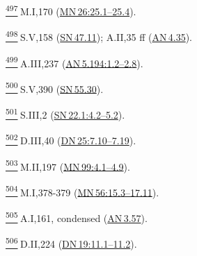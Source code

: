 \label{footprints_split_025.html_fn497}
\hyperref[footprints_split_013.htmlux5cux23fnref497]{\textsuperscript{497}} M.I,170
(\href{https://suttacentral.net/mn26/en/sujato\#25.1}{MN\,26:25.1--25.4}).

\label{footprints_split_025.html_fn498}
\hyperref[footprints_split_013.htmlux5cux23fnref498]{\textsuperscript{498}} S.V,158
(\href{https://suttacentral.net/sn47.11/en/sujato}{SN\,47.11}); A.II,35
ff (\href{https://suttacentral.net/an4.35/en/sujato}{AN\,4.35}).

\label{footprints_split_025.html_fn499}
\hyperref[footprints_split_013.htmlux5cux23fnref499]{\textsuperscript{499}} A.III,237
(\href{https://suttacentral.net/an5.194/en/sujato\#1.2}{AN\,5.194:1.2--2.8}).

\label{footprints_split_025.html_fn500}
\hyperref[footprints_split_013.htmlux5cux23fnref500]{\textsuperscript{500}} S.V,390
(\href{https://suttacentral.net/sn55.30/en/sujato}{SN\,55.30}).

\label{footprints_split_025.html_fn501}
\hyperref[footprints_split_013.htmlux5cux23fnref501]{\textsuperscript{501}} S.III,2
(\href{https://suttacentral.net/sn22.1/en/sujato\#4.2}{SN\,22.1:4.2--5.2}).

\label{footprints_split_025.html_fn502}
\hyperref[footprints_split_013.htmlux5cux23fnref502]{\textsuperscript{502}} D.III,40
(\href{https://suttacentral.net/dn25/en/sujato\#7.10}{DN\,25:7.10--7.19}).

\label{footprints_split_025.html_fn503}
\hyperref[footprints_split_013.htmlux5cux23fnref503]{\textsuperscript{503}} M.II,197
(\href{https://suttacentral.net/mn99/en/sujato\#4.1}{MN\,99:4.1--4.9}).

\label{footprints_split_025.html_fn504}
\hyperref[footprints_split_013.htmlux5cux23fnref504]{\textsuperscript{504}} M.I,378-379
(\href{https://suttacentral.net/mn56/en/sujato\#15.3}{MN\,56:15.3--17.11}).

\label{footprints_split_025.html_fn505}
\hyperref[footprints_split_013.htmlux5cux23fnref505]{\textsuperscript{505}} A.I,161,
condensed (\href{https://suttacentral.net/an3.57/en/sujato}{AN\,3.57}).

\label{footprints_split_025.html_fn506}
\hyperref[footprints_split_013.htmlux5cux23fnref506]{\textsuperscript{506}} D.II,224
(\href{https://suttacentral.net/dn19/en/sujato\#11.1}{DN\,19:11.1--11.2}).

